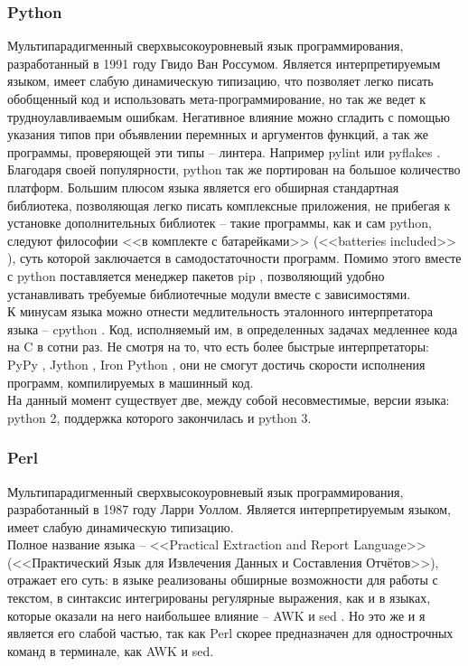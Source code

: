 \subsubsection{Python}\label{sec:ch2/sec1/sub1/sub2}
Мультипарадигменный сверхвысокоуровневый язык программирования,
разработанный в 1991 году Гвидо Ван Россумом.
Является интерпретируемым языком, имеет слабую динамическую типизацию,
что позволяет легко писать обобщенный код и использовать мета-программирование,
но так же ведет к трудноулавливаемым ошибкам. Негативное влияние можно сгладить
с помощью указания типов при объявлении перемнных и аргументов функций, а так же 
программы, проверяющей эти типы -- линтера. Например pylint \autocite{pylint} или
pyflakes \autocite{pyflakes}.\\
Благодаря своей популярности, python так же портирован на большое количество платформ.
Большим плюсом языка является его обширная стандартная библиотека, позволяющая легко
писать комплексные приложения, не прибегая к установке дополнительных библиотек --
такие программы, как и сам python, следуют философии <<в комплекте с батарейками>>
(<<batteries included>> \autocite{batteries-included}), суть которой заключается в 
самодостаточности программ. Помимо этого вместе с python поставляется менеджер
пакетов pip \autocite{pip}, позволяющий удобно устанавливать требуемые библиотечные модули вместе
с зависимостями.\\
К минусам языка можно отнести медлительность эталонного интерпретатора языка -- cpython \autocite{cpython}.
Код, исполняемый им, в определенных задачах медленнее кода на C в сотни раз. Не смотря на то, что
есть более быстрые интерпретаторы: PyPy \autocite{pypy}, Jython \autocite{jython}, Iron Python \autocite{iron-python},
они не смогут достичь скорости исполнения программ, компилируемых в машинный код.\\
На данный момент существует две, между собой несовместимые, версии языка: 
python 2, поддержка которого закончилась  и python 3.

\subsubsection{Perl}\label{sec:ch2/sec1/sub1/sub2}
Мультипарадигменный сверхвысокоуровневый 
язык программирования, разработанный в 1987 году Ларри Уоллом.
Является интерпретируемым языком, имеет слабую динамическую типизацию.\\
Полное название языка -- <<Practical Extraction and Report Language>> 
(<<Практический Язык для Извлечения Данных и Составления Отчётов>>), отражает его суть:
в языке реализованы обширные возможности для работы с текстом, в синтаксис интегрированы 
регулярные выражения, как и в языках, которые оказали на него наибольшее влияние --
AWK \autocite{awk} и sed \autocite{sed}. Но это же и я является его слабой частью, так как
Perl скорее предназначен для однострочных команд в терминале, как AWK и
sed.
        
